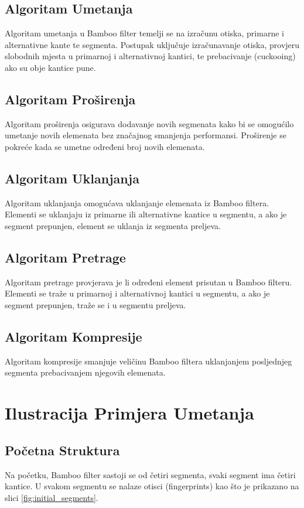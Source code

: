 \documentclass[seminarskirad]{fer}
\begin{document}
	\subsection{Algoritam Umetanja}
	Algoritam umetanja u Bamboo filter temelji se na izračunu otiska, primarne i alternativne kante te segmenta. Postupak uključuje izračunavanje otiska, provjeru slobodnih mjesta u primarnoj i alternativnoj kantici, te prebacivanje (cuckooing) ako su obje kantice pune.
	
	\subsection{Algoritam Proširenja}
	Algoritam proširenja osigurava dodavanje novih segmenata kako bi se omogućilo umetanje novih elemenata bez značajnog smanjenja performansi. Proširenje se pokreće kada se umetne određeni broj novih elemenata.
	
	\subsection{Algoritam Uklanjanja}
	Algoritam uklanjanja omogućava uklanjanje elemenata iz Bamboo filtera. Elementi se uklanjaju iz primarne ili alternativne kantice u segmentu, a ako je segment prepunjen, element se uklanja iz segmenta preljeva.
	
	\subsection{Algoritam Pretrage}
	Algoritam pretrage provjerava je li određeni element prisutan u Bamboo filteru. Elementi se traže u primarnoj i alternativnoj kantici u segmentu, a ako je segment prepunjen, traže se i u segmentu preljeva.
	
	\subsection{Algoritam Kompresije}
	Algoritam kompresije smanjuje veličinu Bamboo filtera uklanjanjem posljednjeg segmenta prebacivanjem njegovih elemenata.
	
	
	\section{Ilustracija Primjera Umetanja}
	\subsection{Početna Struktura}
	Na početku, Bamboo filter sastoji se od četiri segmenta, svaki segment ima četiri kantice. U svakom segmentu se nalaze otisci (fingerprints) kao što je prikazano na slici \ref{fig:initial_segments}.
	
\end{document}
